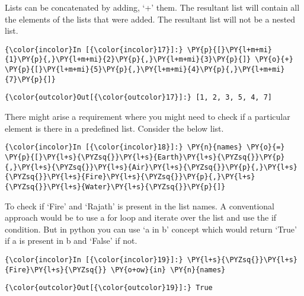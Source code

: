     Lists can be concatenated by adding, `+' them. The resultant list will
contain all the elements of the lists that were added. The resultant
list will not be a nested list.

    \begin{Verbatim}[commandchars=\\\{\}]
{\color{incolor}In [{\color{incolor}17}]:} \PY{p}{[}\PY{l+m+mi}{1}\PY{p}{,}\PY{l+m+mi}{2}\PY{p}{,}\PY{l+m+mi}{3}\PY{p}{]} \PY{o}{+} \PY{p}{[}\PY{l+m+mi}{5}\PY{p}{,}\PY{l+m+mi}{4}\PY{p}{,}\PY{l+m+mi}{7}\PY{p}{]}
\end{Verbatim}

            \begin{Verbatim}[commandchars=\\\{\}]
{\color{outcolor}Out[{\color{outcolor}17}]:} [1, 2, 3, 5, 4, 7]
\end{Verbatim}
        
    There might arise a requirement where you might need to check if a
particular element is there in a predefined list. Consider the below
list.

    \begin{Verbatim}[commandchars=\\\{\}]
{\color{incolor}In [{\color{incolor}18}]:} \PY{n}{names} \PY{o}{=} \PY{p}{[}\PY{l+s}{\PYZsq{}}\PY{l+s}{Earth}\PY{l+s}{\PYZsq{}}\PY{p}{,}\PY{l+s}{\PYZsq{}}\PY{l+s}{Air}\PY{l+s}{\PYZsq{}}\PY{p}{,}\PY{l+s}{\PYZsq{}}\PY{l+s}{Fire}\PY{l+s}{\PYZsq{}}\PY{p}{,}\PY{l+s}{\PYZsq{}}\PY{l+s}{Water}\PY{l+s}{\PYZsq{}}\PY{p}{]}
\end{Verbatim}

    To check if `Fire' and `Rajath' is present in the list names. A
conventional approach would be to use a for loop and iterate over the
list and use the if condition. But in python you can use `a in b'
concept which would return `True' if a is present in b and `False' if
not.

    \begin{Verbatim}[commandchars=\\\{\}]
{\color{incolor}In [{\color{incolor}19}]:} \PY{l+s}{\PYZsq{}}\PY{l+s}{Fire}\PY{l+s}{\PYZsq{}} \PY{o+ow}{in} \PY{n}{names}
\end{Verbatim}

            \begin{Verbatim}[commandchars=\\\{\}]
{\color{outcolor}Out[{\color{outcolor}19}]:} True
\end{Verbatim}
        
